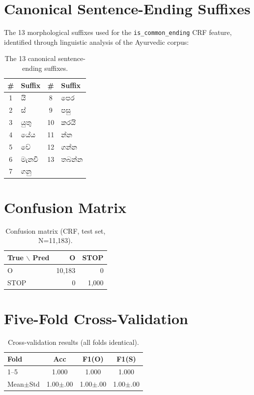 \documentclass[11pt,a4paper]{article}
\begin{document}
\appendix

\section{Canonical Sentence-Ending Suffixes}
\label{app:suffixes}

The 13 morphological suffixes used for the \texttt{is\_common\_ending} CRF feature, identified through linguistic analysis of the Ayurvedic corpus:

\begin{table}[h]
\small
\centering
\begin{tabular}{clcl}
\toprule
\# & Suffix & \# & Suffix \\
\midrule
1 & යි & 8 & පෙර \\
2 & ස් & 9 & පසු \\
3 & යුතු & 10 & කරයි \\
4 & යේය & 11 & න්න \\
5 & වේ & 12 & ගන්න \\
6 & මැනවි & 13 & තබන්න \\
7 & ගනු & & \\
\bottomrule
\end{tabular}
\caption{The 13 canonical sentence-ending suffixes.}
\end{table}

\section{Confusion Matrix}
\label{app:confusion}

\begin{table}[h]
\small
\centering
\begin{tabular}{l|rr}
\toprule
True $\backslash$ Pred & O & STOP \\
\midrule
O & 10,183 & 0 \\
STOP & 0 & 1,000 \\
\bottomrule
\end{tabular}
\caption{Confusion matrix (CRF, test set, N=11,183).}
\end{table}

\section{Five-Fold Cross-Validation}
\label{app:cv}

\begin{table}[h]
\small
\centering
\begin{tabular}{lccc}
\toprule
Fold & Acc & F1(O) & F1(S) \\
\midrule
1--5 & 1.000 & 1.000 & 1.000 \\
\midrule
Mean$\pm$Std & 1.00$\pm$.00 & 1.00$\pm$.00 & 1.00$\pm$.00 \\
\bottomrule
\end{tabular}
\caption{Cross-validation results (all folds identical).}
\end{table}
\end{document}

